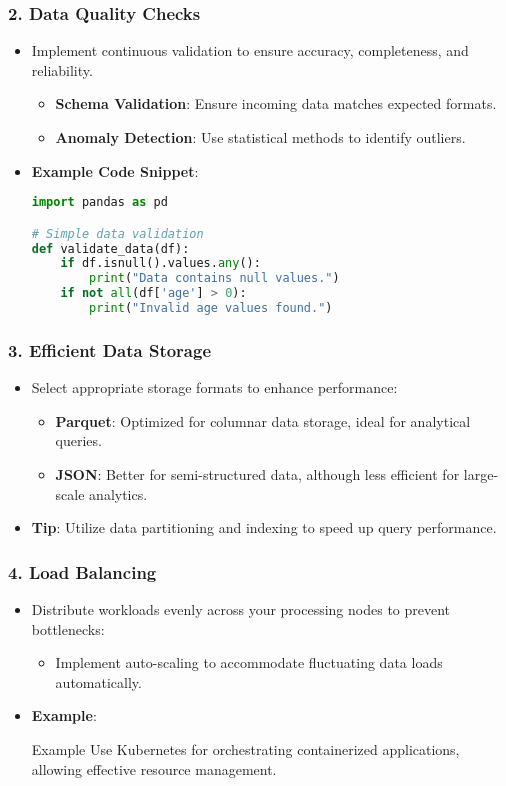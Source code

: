 \documentclass[aspectratio=169]{beamer}
\begin{document}
\begin{frame}[fragile]
    \frametitle{2. Data Quality Checks}
    \begin{itemize}
        \item Implement continuous validation to ensure accuracy, completeness, and reliability.
        \begin{itemize}
            \item \textbf{Schema Validation}: Ensure incoming data matches expected formats.
            \item \textbf{Anomaly Detection}: Use statistical methods to identify outliers.
        \end{itemize}
        \item \textbf{Example Code Snippet}:
            \begin{lstlisting}[language=Python]
import pandas as pd

# Simple data validation
def validate_data(df):
    if df.isnull().values.any():
        print("Data contains null values.")
    if not all(df['age'] > 0):
        print("Invalid age values found.")
            \end{lstlisting}
    \end{itemize}
\end{frame}

\begin{frame}
    \frametitle{3. Efficient Data Storage}
    \begin{itemize}
        \item Select appropriate storage formats to enhance performance:
            \begin{itemize}
                \item \textbf{Parquet}: Optimized for columnar data storage, ideal for analytical queries.
                \item \textbf{JSON}: Better for semi-structured data, although less efficient for large-scale analytics.
            \end{itemize}
        \item \textbf{Tip}: Utilize data partitioning and indexing to speed up query performance.
    \end{itemize}
\end{frame}

\begin{frame}
    \frametitle{4. Load Balancing}
    \begin{itemize}
        \item Distribute workloads evenly across your processing nodes to prevent bottlenecks:
            \begin{itemize}
                \item Implement auto-scaling to accommodate fluctuating data loads automatically.
            \end{itemize}
        \item \textbf{Example}:
            \begin{block}{Example}
                Use Kubernetes for orchestrating containerized applications, allowing effective resource management.
            \end{block}
    \end{itemize}
\end{frame}
\end{document}
